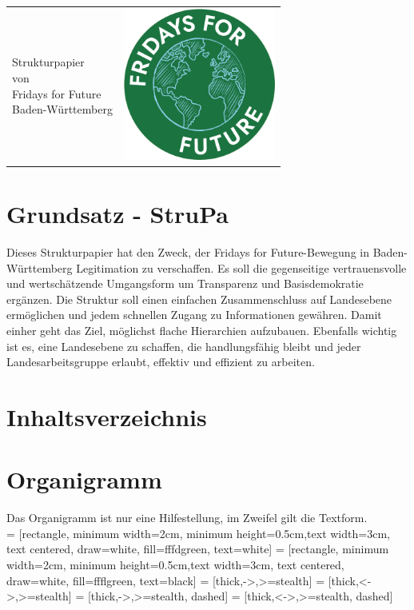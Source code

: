 \documentclass[a4paper,
  ]{scrartcl}
\begin{document}


\begin{tabularx}{\textwidth}{X m{5cm}}
      \centering \Huge \color{fffgreen} \MakeUppercase{Strukturpapier \\ von \\Fridays for Future\\Baden-Württemberg} & \includegraphics[width=5cm]{Logo.png}
\end{tabularx}



\section{Grundsatz - StruPa}
Dieses Strukturpapier hat den Zweck, der Fridays for Future-Bewegung in Baden-Württemberg
Legitimation zu verschaffen. Es soll die gegenseitige vertrauensvolle und wertschätzende Umgangsform
um Transparenz und Basisdemokratie ergänzen. Die Struktur soll einen einfachen Zusammenschluss auf
Landesebene ermöglichen und jedem schnellen Zugang zu Informationen gewähren. Damit einher geht
das Ziel, möglichst flache Hierarchien aufzubauen. Ebenfalls wichtig ist es, eine Landesebene zu schaffen,
die handlungsfähig bleibt und jeder
Landesarbeitsgruppe erlaubt, effektiv und effizient zu arbeiten.
\section{Inhaltsverzeichnis}
\tableofcontents
\section{Organigramm}
Das Organigramm ist nur eine Hilfestellung, im Zweifel gilt die Textform.\\
 = [rectangle, minimum width=2cm, minimum height=0.5cm,text width=3cm, text centered, draw=white, fill=fffdgreen, text=white]
 = [rectangle, minimum width=2cm, minimum height=0.5cm,text width=3cm, text centered, draw=white, fill=ffflgreen, text=black]
 = [thick,->,>=stealth]
 = [thick,<->,>=stealth]
 = [thick,->,>=stealth, dashed]
 = [thick,<->,>=stealth, dashed]
\end{document}
